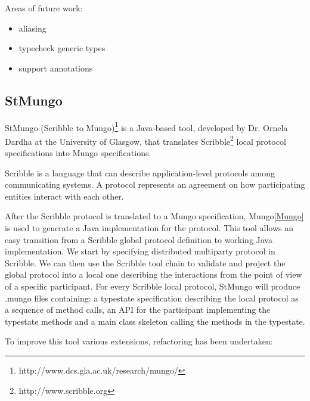 Areas of future work:
\begin{itemize}
  \item aliasing
  \item typecheck generic types
  \item support annotations
\end{itemize}

\subsection{StMungo}
\label{sub:StMungo}

StMungo (Scribble to Mungo)\footnote{http://www.dcs.gla.ac.uk/research/mungo/} is a Java-based tool, developed by Dr. Ornela Dardha at the University of Glasgow, that translates Scribble\footnote{http://www.scribble.org} local protocol specifications into Mungo specifications.

Scribble is a language that can describe application-level protocols among communicating systems. A protocol represents an agreement on how participating entities interact with each other.

After the Scribble protocol is translated to a Mungo specification, Mungo\ref{Mungo} is used to generate a Java implementation for the protocol. This tool allows an easy transition from a Scribble global protocol definition to working Java implementation. We start by specifying distributed multiparty protocol in Scribble. We can then use the Scribble tool chain to validate and project the global protocol into a local one describing the interactions from the point of view of a specific participant. For every Scribble local protocol, StMungo will produce .mungo files containing: a typestate specification describing the local protocol as a sequence of method calls, an API for the participant implementing the typestate methods and a main class skeleton calling the methods in the typestate.

To improve this tool various extensions, refactoring has been undertaken:

